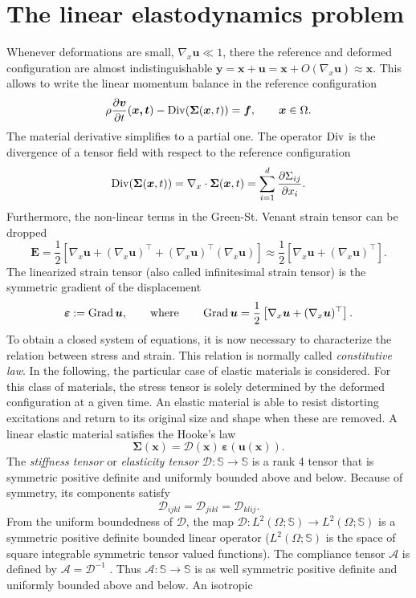 \section{The linear elastodynamics problem}
Whenever deformations are small, $\nabla_x\bm{u} \ll 1$, there the reference and deformed configuration are almost indistinguishable $\bm{y} = \bm{x} + \bm{u} = \bm{x}  + O(\nabla_x\bm{u}) \approx \bm{x}$. This allows to write the linear momentum balance in the reference configuration
\begin{equation*}
	\rho \diffp{\bm{v}}{t}(\bm{x, t}) - \Div(\bm\Sigma(\bm{x}, t)) = \bm{f}, \qquad \bm{x} \in \Omega.
\end{equation*}
The material derivative simplifies to a partial one. The operator $\operatorname*{Div}$ is the divergence of a tensor field with respect to the reference configuration
\[
\Div(\bm\Sigma(\bm{x}, t)) = \nabla_x \cdot \bm\Sigma(\bm{x}, t) = \sum_{i=1}^{d}\diffp{\Sigma_{ij}}{x_i}.
\]
Furthermore, the non-linear terms in the Green-St. Venant strain tensor can be dropped
\[
\bm{E} = \frac{1}{2}\left[\nabla_x \bm{u} + (\nabla_x \bm{u})^\top + (\nabla_x \bm{u})^\top (\nabla_x \bm{u})\right]
\approx \frac{1}{2}\left[\nabla_x \bm{u} + (\nabla_x \bm{u})^\top\right].
\]
The linearized strain tensor (also called infinitesimal strain tensor) is the symmetric gradient of the displacement
\[
\bm{\varepsilon} := \operatorname*{Grad}\bm{u}, \qquad \text{where} \qquad \operatorname*{Grad}\bm{u} = \frac{1}{2}\left[\nabla_x \bm{u} + (\nabla_x \bm{u})^\top\right].
\]
To obtain a closed system of equations, it is now necessary to characterize the relation between stress and strain. This relation is normally called \textit{constitutive law}. In the following, the particular case of elastic materials is considered. For this class of materials, the stress tensor is solely determined by the deformed configuration at a given time. An elastic material is able to resist distorting excitations and return to its original size and shape when these are removed. A linear elastic material satisfies the Hooke's law
\[
\bm{\Sigma}(\bm{x}) = \bm{\mathcal{D}}(\bm{x}) \, \bm{\varepsilon}(\bm{u}(\bm{x})).
\]
The \textit{stiffness tensor} or \textit{elasticity tensor} $\bm{\mathcal{D}} : \mathbb{S} \rightarrow \mathbb{S}$ is a rank 4 tensor that is symmetric positive definite and uniformly bounded above and below. Because of symmetry, its components satisfy
\[
\mathcal{D}_{ijkl} = \mathcal{D}_{jikl} = \mathcal{D}_{klij}.
\]
From the uniform boundedness of $\bm{\mathcal{D}}$, the map
$\bm{\mathcal{D}}: L^2 (\Omega; \mathbb{S}) \rightarrow L^2 (\Omega; \mathbb{S})$ is a symmetric positive definite bounded linear operator ($L^2 (\Omega; \mathbb{S})$ is the space of square integrable symmetric tensor valued functions). The compliance tensor $\bm{\mathcal{A}}$ is defined by $\bm{\mathcal{A}} = \bm{\mathcal{D}}^{-1}$ . Thus $\bm{\mathcal{A}} : \mathbb{S} \rightarrow \mathbb{S}$ is as well symmetric positive definite and uniformly bounded above and below. An isotropic
